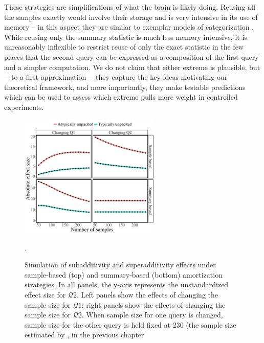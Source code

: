 These strategies are simplifications of what the brain is likely doing. 
Reusing all the samples exactly would involve their storage and is very intensive in its use of memory -- in this aspect they are similar to exemplar models of categorization \citep{nosofsky1986attention,medin1978context}. 
While reusing only the summary statistic is much less memory intensive, it is unreasonably inflexible to restrict reuse of only the exact statistic in the few places that the second query can be expressed as a composition of the first query and a simpler computation. We do not claim that either extreme is plausible, but ---to a first approximation--- they capture the key ideas motivating our theoretical framework, and more importantly, they make testable predictions which can be used to assess which extreme pulls more weight in controlled experiments.

\begin{figure}%
\centering
\includegraphics[width=0.6\textwidth]{figures/changingN.pdf}
\caption{Simulation of subadditivity and superadditivity effects under sample-based (top) and summary-based (bottom) amortization strategies. In all panels, the y-axis represents the unstandardized effect size for $\mathcal{Q}2$. Left panels show the effects of changing the sample size for $\mathcal{Q}1$; right panels show the effects of changing the sample size for $\mathcal{Q}2$. When sample size for one query is changed, sample size for the other query is held fixed at 230 (the sample size estimated by \citet{dasgupta2017hypotheses}, in the previous chapter}.
\label{fig:changeN}
\end{figure}

